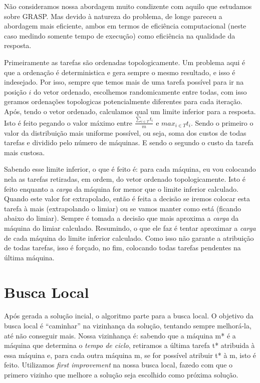 \documentclass{report}
\begin{document}
Não consideramos nossa abordagem muito condizente com aquilo que estudamos sobre GRASP. Mas devido à natureza do
problema, de longe pareceu a abordagem mais eficiente, ambos em termos de eficiência computacional (neste caso medindo
somente tempo de execução) como eficiência na qualidade da resposta.

Primeiramente as tarefas são ordenadas topologicamente. Um problema aqui é que a ordenação é deterministica e gera
sempre o mesmo resultado, e isso é indesejado. Por isso, sempre que temos mais de uma tarefa possível para ir na
posição $i$ do vetor ordenado, escolhemos randomicamente entre todas, com isso geramos ordenações topologicas
potencialmente diferentes para cada iteração. Após, tendo o vetor ordenado, calculamos qual um limite inferior para a
resposta. Isto é feito pegando o valor máximo entre $\frac{\sum_{i\in T}t_i}{m}$ e $max_{i\in T}t_i$. Sendo o primeiro
o valor da distribuição mais uniforme possível, ou seja, soma dos custos de todas tarefas e dividido pelo
número de máquinas. E sendo o segundo o custo da tarefa mais custosa.

Sabendo esse limite inferior, o que é feito é: para cada máquina, eu vou colocando nela as tarefas retiradas, em ordem,
do vetor ordenado topologicamente. Isto é feito enquanto a \emph{carga} da máquina for menor que o limite inferior
calculado. Quando este valor for extrapolado, então é feita a decisão se iremos colocar esta tarefa à mais
(extrapolando o limiar) ou se vamos manter como está (ficando abaixo do limiar). Sempre é tomada a decisão que mais
aproxima a \emph{carga} da máquina do limiar calculado. Resumindo, o que ele faz é tentar aproximar a \emph{carga} de
cada máquina do limite inferior calculado. Como isso não garante a atribuição de todas tarefas, isso é forçado, no fim,
colocando todas tarefas pendentes na última máquina.

\section{Busca Local}

Após gerada a solução incial, o algoritmo parte para a busca local. O objetivo da busca local é ``caminhar'' na
vizinhança da solução, tentando sempre melhorá-la, até não conseguir mais. Nossa vizinhança é: sabendo que a máquina m*
é a máquina que determina o \emph{tempo de ciclo}, retiramos a última tarefa t* atribuida à essa máquina e, para cada
outra máquina m, se for possível atribuir t* à m, isto é feito. Utilizamos \textit{first improvement} na nossa busca
local, fazedo com que o primero vizinho que melhore a solução seja escolhido como próxima solução.
\end{document}
